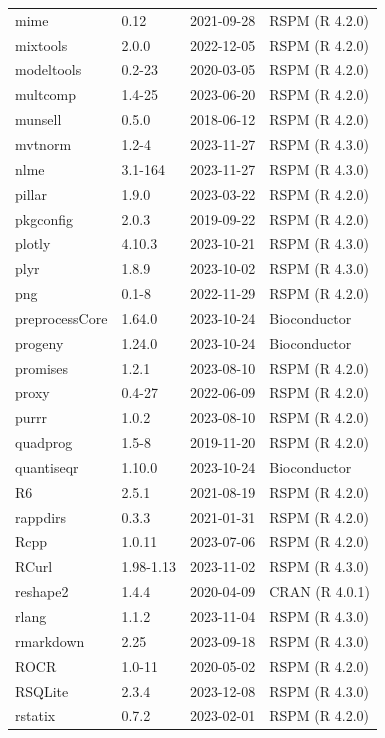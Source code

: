 \begin{longtable}[t]{llll}
\addlinespace
mime & 0.12 & 2021-09-28 & RSPM (R 4.2.0)\\
mixtools & 2.0.0 & 2022-12-05 & RSPM (R 4.2.0)\\
modeltools & 0.2-23 & 2020-03-05 & RSPM (R 4.2.0)\\
multcomp & 1.4-25 & 2023-06-20 & RSPM (R 4.2.0)\\
munsell & 0.5.0 & 2018-06-12 & RSPM (R 4.2.0)\\
\addlinespace
mvtnorm & 1.2-4 & 2023-11-27 & RSPM (R 4.3.0)\\
nlme & 3.1-164 & 2023-11-27 & RSPM (R 4.3.0)\\
pillar & 1.9.0 & 2023-03-22 & RSPM (R 4.2.0)\\
pkgconfig & 2.0.3 & 2019-09-22 & RSPM (R 4.2.0)\\
plotly & 4.10.3 & 2023-10-21 & RSPM (R 4.3.0)\\
\addlinespace
plyr & 1.8.9 & 2023-10-02 & RSPM (R 4.3.0)\\
png & 0.1-8 & 2022-11-29 & RSPM (R 4.2.0)\\
preprocessCore & 1.64.0 & 2023-10-24 & Bioconductor\\
progeny & 1.24.0 & 2023-10-24 & Bioconductor\\
promises & 1.2.1 & 2023-08-10 & RSPM (R 4.2.0)\\
\addlinespace
proxy & 0.4-27 & 2022-06-09 & RSPM (R 4.2.0)\\
purrr & 1.0.2 & 2023-08-10 & RSPM (R 4.2.0)\\
quadprog & 1.5-8 & 2019-11-20 & RSPM (R 4.2.0)\\
quantiseqr & 1.10.0 & 2023-10-24 & Bioconductor\\
R6 & 2.5.1 & 2021-08-19 & RSPM (R 4.2.0)\\
\addlinespace
rappdirs & 0.3.3 & 2021-01-31 & RSPM (R 4.2.0)\\
Rcpp & 1.0.11 & 2023-07-06 & RSPM (R 4.2.0)\\
RCurl & 1.98-1.13 & 2023-11-02 & RSPM (R 4.3.0)\\
reshape2 & 1.4.4 & 2020-04-09 & CRAN (R 4.0.1)\\
rlang & 1.1.2 & 2023-11-04 & RSPM (R 4.3.0)\\
\addlinespace
rmarkdown & 2.25 & 2023-09-18 & RSPM (R 4.3.0)\\
ROCR & 1.0-11 & 2020-05-02 & RSPM (R 4.2.0)\\
RSQLite & 2.3.4 & 2023-12-08 & RSPM (R 4.3.0)\\
rstatix & 0.7.2 & 2023-02-01 & RSPM (R 4.2.0)\\

\end{longtable}
